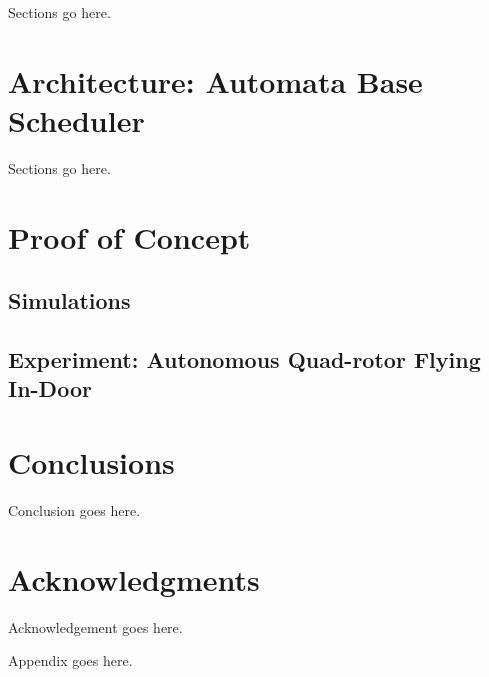 \documentclass{sig-alternate-ipsn13}
\begin{document}
Sections go here.

\section{Architecture: Automata Base Scheduler}

Sections go here.

\section{Proof of Concept}
\label{sec:concept}

\subsection{Simulations}

\subsection{Experiment: Autonomous Quad-rotor Flying In-Door}



\section{Conclusions}
Conclusion goes here.


\section*{Acknowledgments}
Acknowledgement goes here.

%

%
%
\appendix

Appendix goes here.

\end{document}
